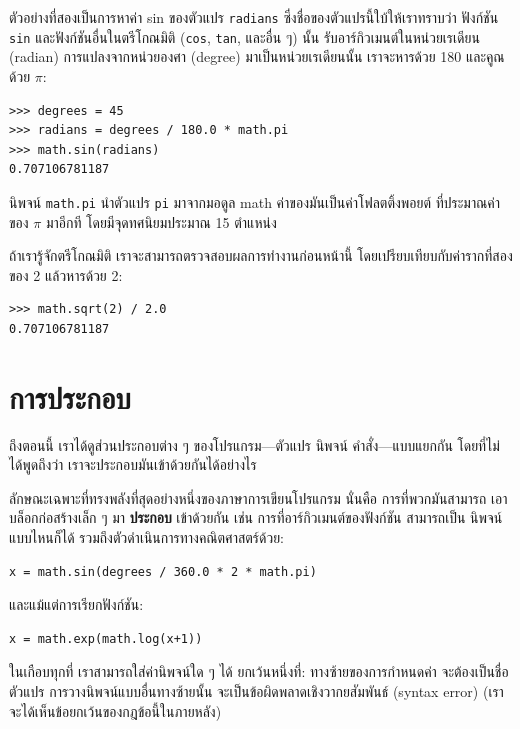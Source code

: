 ตัวอย่างที่สองเป็นการหาค่า sin ของตัวแปร {\tt radians} ซึ่งชื่อของตัวแปรนี้ใบ้ให้เราทราบว่า 
ฟังก์ชัน {\tt sin} และฟังก์ชันอื่นในตรีโกณมิติ ({\tt cos}, {\tt tan}, 
และอื่น ๆ) นั้น รับอาร์กิวเมนต์ในหน่วยเรเดียน (radian)  การแปลงจากหน่วยองศา (degree) 
มาเป็นหน่วยเรเดียนนั้น เราจะหารด้วย 180 และคูณด้วย {\scriptsize$\pi$}:

\begin{verbatim}
>>> degrees = 45
>>> radians = degrees / 180.0 * math.pi
>>> math.sin(radians)
0.707106781187
\end{verbatim}
%
นิพจน์ {\tt math.pi} นำตัวแปร {\tt pi} มาจากมอดูล math ค่าของมันเป็นค่าโฟลตติ้งพอยต์
ที่ประมาณค่าของ {\scriptsize$\pi$} มาอีกที โดยมีจุดทศนิยมประมาณ 15 ตำแหน่ง

ถ้าเรารู้จักตรีโกณมิติ เราจะสามารถตรวจสอบผลการทำงานก่อนหน้านี้ โดยเปรียบเทียบกับค่ารากที่สองของ 2 
แล้วหารด้วย 2:

\begin{verbatim}
>>> math.sqrt(2) / 2.0
0.707106781187
\end{verbatim}
%


\section{การประกอบ} %

ถึงตอนนี้ เราได้ดูส่วนประกอบต่าง ๆ ของโปรแกรม---ตัวแปร นิพจน์ คำสั่ง---แบบแยกกัน 
โดยที่ไม่ได้พูดถึงว่า เราจะประกอบมันเข้าด้วยกันได้อย่างไร

ลักษณะเฉพาะที่ทรงพลังที่สุดอย่างหนึ่งของภาษาการเขียนโปรแกรม นั่นคือ การที่พวกมันสามารถ
เอาบล็อกก่อสร้างเล็ก ๆ มา {\bf ประกอบ} เข้าด้วยกัน เช่น การที่อาร์กิวเมนต์ของฟังก์ชัน สามารถเป็น
นิพจน์แบบไหนก็ได้ รวมถึงตัวดำเนินการทางคณิตศาสตร์ด้วย:

\begin{verbatim}
x = math.sin(degrees / 360.0 * 2 * math.pi)
\end{verbatim}
%
และแม้แต่การเรียกฟังก์ชัน:

\begin{verbatim}
x = math.exp(math.log(x+1))
\end{verbatim}
%
ในเกือบทุกที่ เราสามารถใส่ค่านิพจน์ใด ๆ ได้ ยกเว้นหนึ่งที่: ทางซ้ายของการกำหนดค่า
จะต้องเป็นชื่อตัวแปร การวางนิพจน์แบบอื่นทางซ้ายนั้น จะเป็นข้อผิดพลาดเชิงวากยสัมพันธ์ (syntax error) 
(เราจะได้เห็นข้อยกเว้นของกฎข้อนี้ในภายหลัง)

